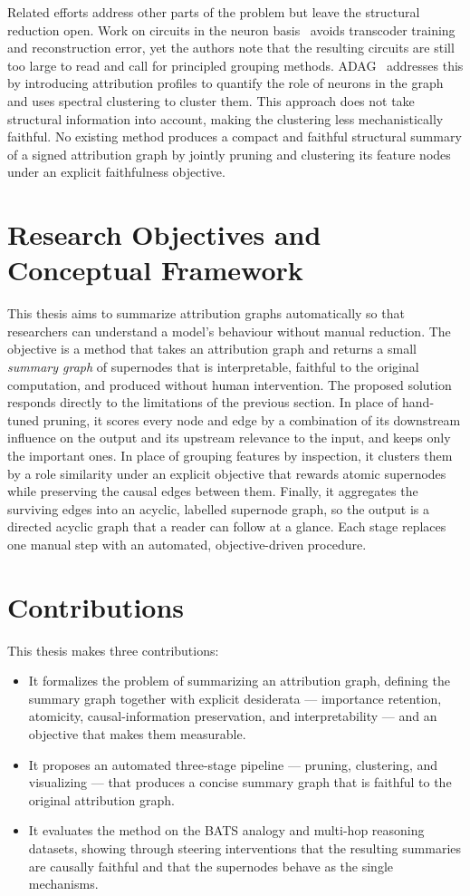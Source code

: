 \documentclass[../main.tex]{subfiles}
\begin{document}
Related efforts address other parts of the problem but leave the structural reduction open.
Work on circuits in the neuron
basis~\cite{arora2026sparse} avoids transcoder training and reconstruction error, yet the
authors note that the resulting circuits are still too large to read and call for principled
grouping methods.
ADAG~\cite{arora2026adag} addresses this by introducing attribution profiles to quantify the role of
neurons in the graph and uses spectral clustering to cluster them. This approach does not take structural information into account,
making the clustering less mechanistically faithful. No existing method produces a compact and faithful structural summary
of a signed attribution graph by jointly pruning and clustering its feature nodes under an
explicit faithfulness objective.

\section{Research Objectives and Conceptual Framework}
This thesis aims to summarize attribution graphs automatically so that researchers can
understand a model's behaviour without manual reduction. The objective is a method that
takes an attribution graph and returns a small \emph{summary graph} of supernodes that is
interpretable, faithful to the original computation, and produced without human
intervention. The proposed solution responds directly to the limitations of the previous
section. In place of hand-tuned pruning, it scores every node and edge by a combination of
its downstream influence on the output and its upstream relevance to the input, and keeps
only the important ones. In place of grouping features by inspection, it clusters them by a
role similarity under an explicit objective that rewards atomic supernodes while preserving
the causal edges between them. Finally, it aggregates the surviving edges into an acyclic,
labelled supernode graph, so the output is a directed acyclic graph that a reader can follow
at a glance. Each stage replaces one manual step with an automated, objective-driven
procedure.

\section{Contributions}
This thesis makes three contributions:
\begin{itemize}[leftmargin=*,topsep=2pt,itemsep=2pt]
\item It formalizes the problem of summarizing an attribution graph, defining the summary
graph together with explicit desiderata --- importance retention, atomicity,
causal-information preservation, and interpretability --- and an objective that makes them
measurable.
\item It proposes an automated three-stage pipeline --- pruning, clustering, and
visualizing --- that produces a concise summary graph that is faithful to the original attribution graph.
\item It evaluates the method on the BATS analogy and multi-hop reasoning datasets,
showing through steering interventions that the resulting summaries are causally faithful
and that the supernodes behave as the single mechanisms.
\end{itemize}
\end{document}
